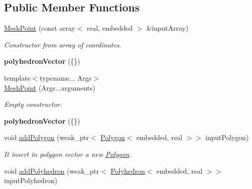 \subsection*{\-Public \-Member \-Functions}
\begin{DoxyCompactItemize}
\item 
\hypertarget{class_mesh_point_aa172f99891420d566250fa3df4f69263}{\hyperlink{class_mesh_point_aa172f99891420d566250fa3df4f69263}{\-Mesh\-Point} (const array$<$ real, embedded $>$ \&input\-Array)}\label{class_mesh_point_aa172f99891420d566250fa3df4f69263}

\begin{DoxyCompactList}\small\item\em \-Constructor from array of coordinates. \end{DoxyCompactList}\item 
\hypertarget{class_mesh_point_acbd4852e167ac9ac93d3a75a661397b3}{{\bfseries polyhedron\-Vector} (\{\})}\label{class_mesh_point_acbd4852e167ac9ac93d3a75a661397b3}

\item 
{\footnotesize template$<$typename... \-Args$>$ }\\\hyperlink{class_mesh_point_a9fce0473490e3f1447d6adc100df166a}{\-Mesh\-Point} (\-Args...\-arguments)
\begin{DoxyCompactList}\small\item\em \-Empty constructor. \end{DoxyCompactList}\item 
\hypertarget{class_mesh_point_acbd4852e167ac9ac93d3a75a661397b3}{{\bfseries polyhedron\-Vector} (\{\})}\label{class_mesh_point_acbd4852e167ac9ac93d3a75a661397b3}

\item 
\hypertarget{class_mesh_point_ad13eb69436888b26b2d8a4eda9ebf21b}{void \hyperlink{class_mesh_point_ad13eb69436888b26b2d8a4eda9ebf21b}{add\-Polygon} (weak\-\_\-ptr$<$ \hyperlink{class_polygon}{\-Polygon}$<$ embedded, real $>$$>$ input\-Polygon)}\label{class_mesh_point_ad13eb69436888b26b2d8a4eda9ebf21b}

\begin{DoxyCompactList}\small\item\em \-It insert in polygon vector a new \hyperlink{class_polygon}{\-Polygon}. \end{DoxyCompactList}\item 
\hypertarget{class_mesh_point_a60b10a88168d410b63a191fa297ba088}{void \hyperlink{class_mesh_point_a60b10a88168d410b63a191fa297ba088}{add\-Polyhedron} (weak\-\_\-ptr$<$ \hyperlink{class_polyhedron}{\-Polyhedron}$<$ embedded, real $>$$>$ input\-Polyhedron)}\label{class_mesh_point_a60b10a88168d410b63a191fa297ba088}


\end{DoxyCompactItemize}

